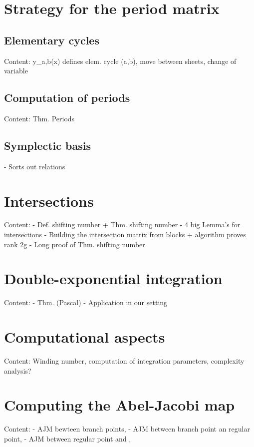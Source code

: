 \section{Strategy for the period matrix}

  \subsection{Elementary cycles}
    Content: y_{a,b}(x) defines elem. cycle \alpha(a,b), move between sheets, change of variable
  
  \subsection{Computation of periods}
    Content: Thm. Periods
  
  \subsection{Symplectic basis}
    - Sorts out relations
  
\section{Intersections}
  Content: - Def. shifting number + Thm. shifting number
	   - 4 big Lemma's for intersections
	   - Building the intersection matrix from blocks + algorithm proves rank 2g
	   - Long proof of Thm. shifting number
  
\section{Double-exponential integration}
  Content: - Thm. (Pascal)
	   - Application in our setting

\section{Computational aspects}
  Content: Winding number, computation of integration parameters, complexity analysis?


\section{Computing the Abel-Jacobi map}
  Content: - AJM bewteen branch points, 
	   - AJM between branch point an regular point,
	   - AJM between regular point and \infty,
	   

